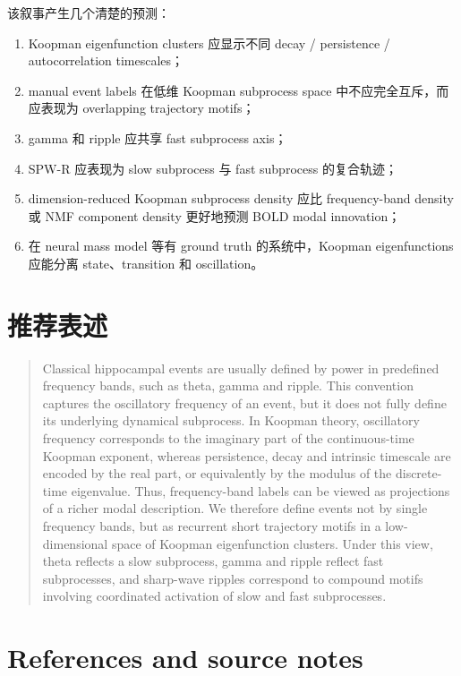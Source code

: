 \documentclass[11pt,a4paper]{ctexart}
\begin{document}
该叙事产生几个清楚的预测：
\begin{enumerate}[leftmargin=2em]
    \item Koopman eigenfunction clusters 应显示不同 decay / persistence / autocorrelation timescales；
    \item manual event labels 在低维 Koopman subprocess space 中不应完全互斥，而应表现为 overlapping trajectory motifs；
    \item gamma 和 ripple 应共享 fast subprocess axis；
    \item SPW-R 应表现为 slow subprocess 与 fast subprocess 的复合轨迹；
    \item dimension-reduced Koopman subprocess density 应比 frequency-band density 或 NMF component density 更好地预测 BOLD modal innovation；
    \item 在 neural mass model 等有 ground truth 的系统中，Koopman eigenfunctions 应能分离 state、transition 和 oscillation。
\end{enumerate}

\section{推荐表述}

\begin{quote}
Classical hippocampal events are usually defined by power in predefined frequency bands, such as theta, gamma and ripple. This convention captures the oscillatory frequency of an event, but it does not fully define its underlying dynamical subprocess. In Koopman theory, oscillatory frequency corresponds to the imaginary part of the continuous-time Koopman exponent, whereas persistence, decay and intrinsic timescale are encoded by the real part, or equivalently by the modulus of the discrete-time eigenvalue. Thus, frequency-band labels can be viewed as projections of a richer modal description. We therefore define events not by single frequency bands, but as recurrent short trajectory motifs in a low-dimensional space of Koopman eigenfunction clusters. Under this view, theta reflects a slow subprocess, gamma and ripple reflect fast subprocesses, and sharp-wave ripples correspond to compound motifs involving coordinated activation of slow and fast subprocesses.
\end{quote}

\section{References and source notes}
\end{document}
